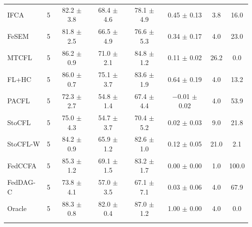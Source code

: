 {{\begin{tabular}{l r c c c c c c}
IFCA & 5 & 82.2 $\pm$ 3.8 & 68.4 $\pm$ 4.6 & 78.1 $\pm$ 4.9 & 0.45 $\pm$ 0.13 & 3.8 & 16.0 \\
FeSEM & 5 & 81.8 $\pm$ 2.5 & 66.5 $\pm$ 4.9 & 76.6 $\pm$ 5.3 & 0.34 $\pm$ 0.17 & 4.0 & 23.0 \\
MTCFL & 5 & 86.2 $\pm$ 0.9 & 71.0 $\pm$ 2.1 & 84.8 $\pm$ 1.2 & 0.11 $\pm$ 0.02 & 26.2 & 0.0 \\
FL+HC & 5 & 86.0 $\pm$ 0.7 & 75.1 $\pm$ 3.7 & 83.6 $\pm$ 1.9 & 0.64 $\pm$ 0.19 & 4.0 & 13.2 \\
PACFL & 5 & 72.3 $\pm$ 2.7 & 54.8 $\pm$ 1.4 & 67.4 $\pm$ 4.4 & $-$0.01 $\pm$ 0.02 & 4.0 & 53.9 \\
StoCFL & 5 & 75.0 $\pm$ 4.3 & 54.7 $\pm$ 3.7 & 70.4 $\pm$ 5.2 & 0.02 $\pm$ 0.03 & 9.0 & 21.8 \\
StoCFL-W & 5 & 84.2 $\pm$ 0.9 & 65.9 $\pm$ 1.2 & 82.6 $\pm$ 1.0 & 0.12 $\pm$ 0.05 & 21.0 & 2.1 \\
FedCCFA & 5 & 85.3 $\pm$ 1.2 & 69.1 $\pm$ 1.5 & 83.2 $\pm$ 1.7 & 0.00 $\pm$ 0.00 & 1.0 & 100.0 \\
FedDAG-C & 5 & 73.8 $\pm$ 4.1 & 57.0 $\pm$ 3.5 & 67.1 $\pm$ 7.1 & 0.03 $\pm$ 0.06 & 4.0 & 67.9 \\
Oracle & 5 & 88.3 $\pm$ 0.8 & 82.0 $\pm$ 0.4 & 87.0 $\pm$ 1.2 & 1.00 $\pm$ 0.00 & 4.0 & 0.0 \\
\addlinespace
\bottomrule
\end{tabular}}
}

